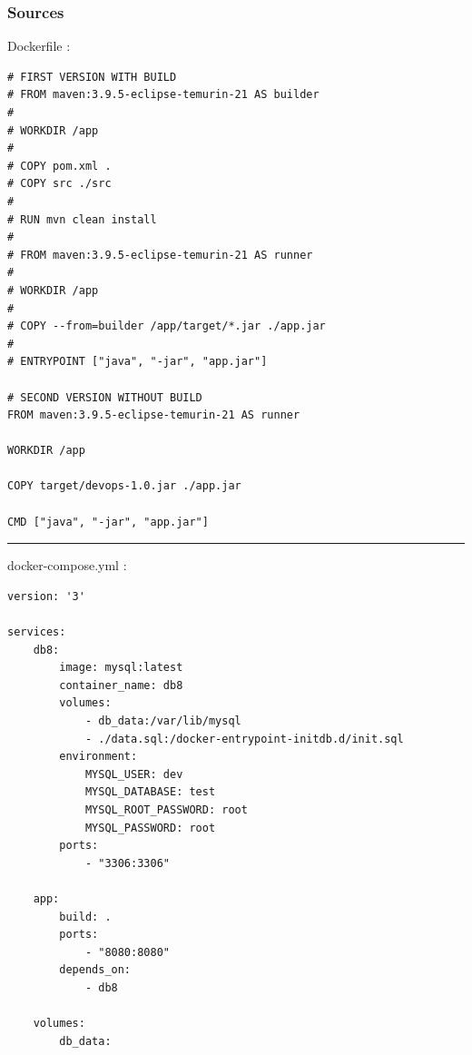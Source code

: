 \subsubsection*{Sources}
Dockerfile :
\begin{verbatim}
# FIRST VERSION WITH BUILD
# FROM maven:3.9.5-eclipse-temurin-21 AS builder
# 
# WORKDIR /app
# 
# COPY pom.xml .
# COPY src ./src
# 
# RUN mvn clean install
# 
# FROM maven:3.9.5-eclipse-temurin-21 AS runner
# 
# WORKDIR /app
# 
# COPY --from=builder /app/target/*.jar ./app.jar
# 
# ENTRYPOINT ["java", "-jar", "app.jar"]

# SECOND VERSION WITHOUT BUILD
FROM maven:3.9.5-eclipse-temurin-21 AS runner

WORKDIR /app

COPY target/devops-1.0.jar ./app.jar

CMD ["java", "-jar", "app.jar"]
\end{verbatim}
\hrule
\vspace{0.4cm}
docker-compose.yml :
\begin{verbatim}
version: '3'

services:
    db8:
        image: mysql:latest
        container_name: db8
        volumes:
            - db_data:/var/lib/mysql
            - ./data.sql:/docker-entrypoint-initdb.d/init.sql
        environment:
            MYSQL_USER: dev
            MYSQL_DATABASE: test
            MYSQL_ROOT_PASSWORD: root
            MYSQL_PASSWORD: root
        ports:
            - "3306:3306"

    app:
        build: .
        ports:
            - "8080:8080"
        depends_on:
            - db8

    volumes:
        db_data:
\end{verbatim}

\newpage

